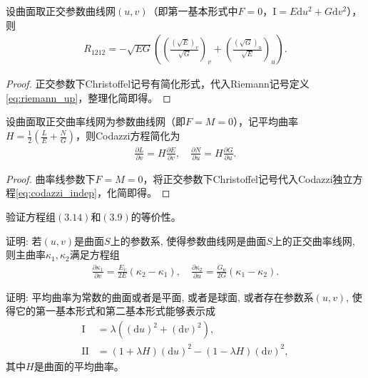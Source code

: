 \documentclass[../../main.tex]{subfiles}%
\begin{document}
\begin{proposition}
设曲面取正交参数曲线网$(u,v)$（即第一基本形式中$F=0$，$\mathrm{I}=E\mathrm{d}u^2+G\mathrm{d}v^2$），则
\begin{align*}
R_{1212} = -\sqrt{EG}\left(\left(\frac{(\sqrt{E})_v}{\sqrt{G}}\right)_v+\left(\frac{(\sqrt{G})_u}{\sqrt{E}}\right)_u\right).
\end{align*}
\end{proposition}

\begin{proof}
正交参数下Christoffel记号有简化形式，代入Riemann记号定义\eqref{eq:riemann_up}，整理化简即得。
\end{proof}

\begin{proposition}
设曲面取正交曲率线网为参数曲线网（即$F=M=0$），记平均曲率$H=\frac{1}{2}\left(\frac{L}{E}+\frac{N}{G}\right)$，则Codazzi方程简化为
\begin{align*}
\frac{\partial L}{\partial v}=H\frac{\partial E}{\partial v},\quad \frac{\partial N}{\partial u}=H\frac{\partial G}{\partial u}.
\end{align*}
\end{proposition}
\begin{proof}
曲率线参数下$F=M=0$，将正交参数下Christoffel记号代入Codazzi独立方程\eqref{eq:codazzi_indep}，化简即得。
\end{proof}

\begin{example}
验证方程组$(3.14)$和$(3.9)$的等价性。
\end{example}

\begin{example}
证明: 若$(u,v)$是曲面$S$上的参数系, 使得参数曲线网是曲面$S$上的正交曲率线网, 则主曲率$\kappa_1,\kappa_2$满足方程组
\begin{align*}
\frac{\partial \kappa_1}{\partial v} = \frac{E_v}{2E}(\kappa_2 - \kappa_1),\quad \frac{\partial \kappa_2}{\partial u} = \frac{G_u}{2G}(\kappa_1 - \kappa_2).
\end{align*}
\end{example}

\begin{example}
证明: 平均曲率为常数的曲面或者是平面, 或者是球面, 或者存在参数系$(u,v)$, 使得它的第一基本形式和第二基本形式能够表示成
\begin{align*}
\mathrm{I} &= \lambda\left((\mathrm{d}u)^2 + (\mathrm{d}v)^2\right),\\
\mathrm{II} &= (1+\lambda H)(\mathrm{d}u)^2 - (1-\lambda H)(\mathrm{d}v)^2,
\end{align*}
其中$H$是曲面的平均曲率。
\end{example}
\end{document}
